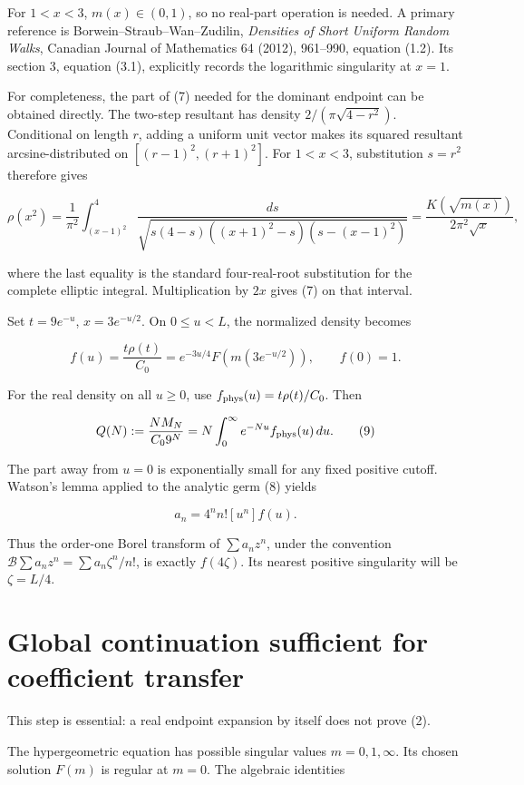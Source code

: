 \documentclass[11pt,letterpaper]{article}
\theoremstyle{remark}
\begin{document}
For \(1<x<3\), \(m(x)\in(0,1)\), so no real-part operation is needed. A
primary reference is Borwein--Straub--Wan--Zudilin, \emph{Densities of
Short Uniform Random Walks}, Canadian Journal of Mathematics 64 (2012),
961--990, equation (1.2). Its section 3, equation (3.1), explicitly
records the logarithmic singularity at \(x=1\).

For completeness, the part of (7) needed for the dominant endpoint can
be obtained directly. The two-step resultant has density
\(2/(\pi\sqrt{4-r^2})\). Conditional on length \(r\), adding a uniform
unit vector makes its squared resultant arcsine-distributed on
\([(r-1)^2,(r+1)^2]\). For \(1<x<3\), substitution \(s=r^2\) therefore
gives

\[
\rho(x^2)=\frac1{\pi^2}\int_{(x-1)^2}^{4}
\frac{ds}{\sqrt{s(4-s)((x+1)^2-s)(s-(x-1)^2)}}
=\frac{K(\sqrt{m(x)})}{2\pi^2\sqrt x},
\]

where the last equality is the standard four-real-root substitution for
the complete elliptic integral. Multiplication by \(2x\) gives (7) on
that interval.

Set \(t=9e^{-u}\), \(x=3e^{-u/2}\). On \(0\le u<L\), the normalized
density becomes

\[
f(u)=\frac{t\rho(t)}{C_0}
=e^{-3u/4}F\!\left(m(3e^{-u/2})\right),\qquad f(0)=1.
\tag{8}
\]

For the real density on all \(u\ge0\), use
\(f_{\rm phys}(u)=t\rho(t)/C_0\). Then

\[
Q(N):=\frac{NM_N}{C_0 9^N}
=N\int_0^\infty e^{-Nu}f_{\rm phys}(u)\,du.
\tag{9}
\]

The part away from \(u=0\) is exponentially small for any fixed positive
cutoff. Watson's lemma applied to the analytic germ (8) yields

\[
\boxed{a_n=4^n n![u^n]f(u).}
\tag{10}
\]

Thus the order-one Borel transform of \(\sum a_n z^n\), under the
convention \(\mathcal B\sum a_nz^n=\sum a_n\zeta^n/n!\), is exactly
\(f(4\zeta)\). Its nearest positive singularity will be \(\zeta=L/4\).

\section{Global continuation sufficient for coefficient
transfer}\label{global-continuation-sufficient-for-coefficient-transfer}

This step is essential: a real endpoint expansion by itself does not
prove (2).

The hypergeometric equation has possible singular values
\(m=0,1,\infty\). Its chosen solution \(F(m)\) is regular at \(m=0\).
The algebraic identities
\end{document}
